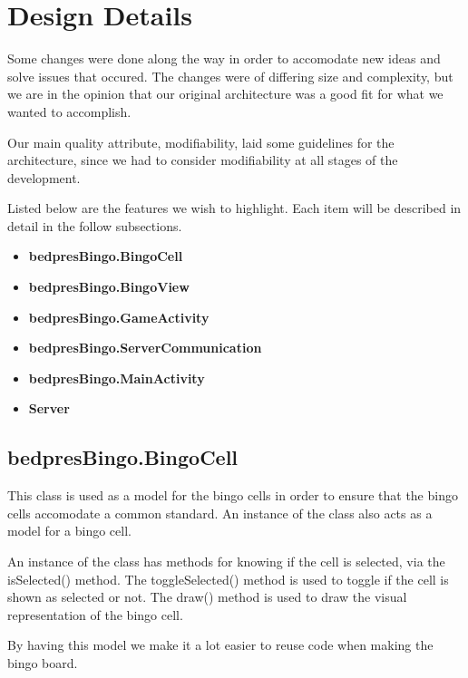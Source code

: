 \section{Design Details}
\label{designdetails}

Some changes were done along the way in order to accomodate new ideas and solve issues that occured. The changes were of differing size and complexity, but we are in the opinion that our original architecture was a good fit for what we wanted to accomplish. 

Our main quality attribute, modifiability, laid some guidelines for the architecture, since we had to consider modifiability at all stages of the development. 

Listed below are the features we wish to highlight.
Each item will be described in detail in the follow subsections.

\begin{itemize}
	\item \textbf{bedpresBingo.BingoCell} \\
	\item \textbf{bedpresBingo.BingoView} \\
	\item \textbf{bedpresBingo.GameActivity}
	\item \textbf{bedpresBingo.ServerCommunication} \\
	\item \textbf{bedpresBingo.MainActivity} \\
	\item \textbf{Server} \\
\end{itemize}


\subsection{bedpresBingo.BingoCell}
This class is used as a model for the bingo cells in order to ensure that the bingo cells accomodate a common standard. An instance of the class also acts as a model for a bingo cell. 

An instance of the class has methods for knowing if the cell is selected, via the isSelected() method. The toggleSelected() method is used to toggle if the cell is shown as selected or not. The draw() method is used to draw the visual representation of the bingo cell. 

By having this model we make it a lot easier to reuse code when making the bingo board.

